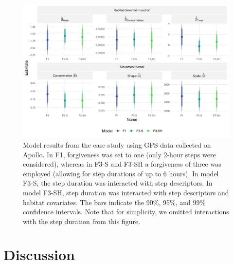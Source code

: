 \documentclass[../FinalThesis.tex]{subfiles}
\begin{document}
\begin{figure}[htpb]
  \begin{center}
  \includegraphics[width = \textwidth]{Figures/CaseStudy.png}
  \caption{Model results from the case study using GPS data collected on Apollo.
  In F1, forgiveness was set to one (only 2-hour steps were considered), whereas
  in F3-S and F3-SH a forgiveness of three was employed (allowing for step
  durations of up to 6 hours). In model F3-S, the step duration was interacted
  with step descriptors. In model F3-SH, step duration was interacted with step
  descriptors and habitat covariates. The bars indicate the 90\%, 95\%, and 99\%
  confidence intervals. Note that for simplicity, we omitted interactions with
  the step duration from this figure.}
  \label{CaseStudy}
  \end{center}
\end{figure}

\section{Discussion}
\end{document}
